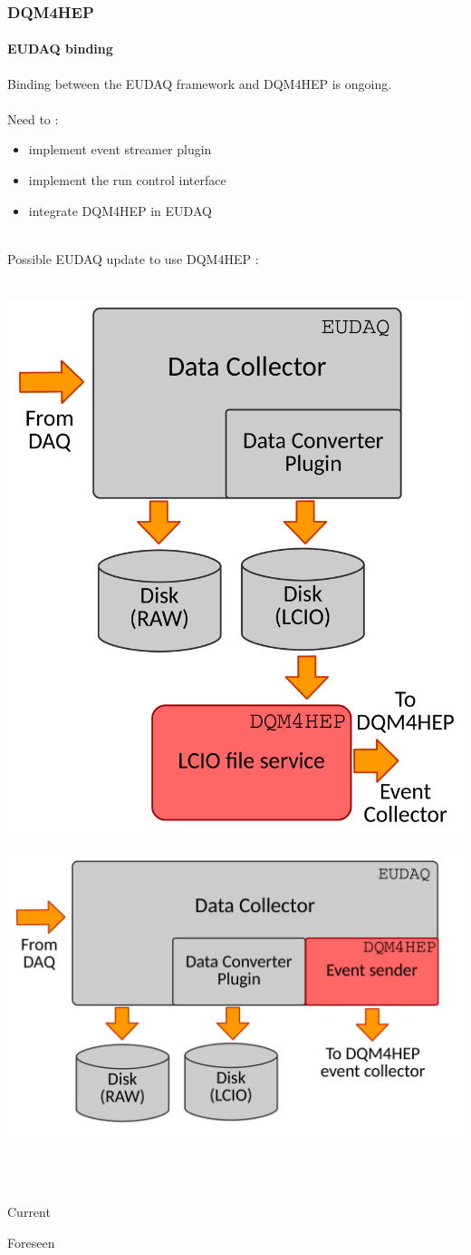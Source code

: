 \documentclass[presentation, 10pt]{beamer}
\begin{document}
\begin{frame}
  \frametitle{DQM4HEP}
  \framesubtitle{EUDAQ binding}
  \scriptsize
  Binding between the EUDAQ framework and DQM4HEP is ongoing.\\
  ~ \\
  Need to :
  \begin{itemize}
    \item implement event streamer plugin
    \item implement the run control interface
    \item integrate DQM4HEP in EUDAQ
  \end{itemize}
  ~ \\
  Possible EUDAQ update to use DQM4HEP : \\
  ~ \\
  \begin{minipage}{0.49\linewidth}
    \centering\includegraphics[width=0.6\linewidth]{figs/EUDAQ-DQM4HEP-Current.pdf}
  \end{minipage}
  \begin{minipage}{0.49\linewidth}
    \centering\includegraphics[width=0.8\linewidth]{figs/EUDAQ-DQM4HEP-Ongoing.pdf}
  \end{minipage} \\
  ~ \\
  \begin{minipage}{0.49\linewidth}
    \centering Current
  \end{minipage}
  \begin{minipage}{0.49\linewidth}
    \centering Foreseen
  \end{minipage}
\end{frame}
\end{document}
